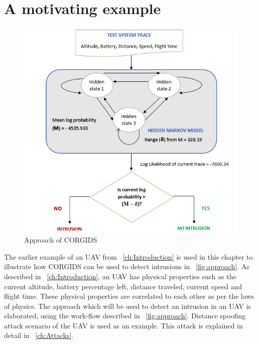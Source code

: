 \section{A motivating example}

\begin{figure}[ht]
    \centering
    \includegraphics[scale=0.75,keepaspectratio = true]{Graphics/CORGIDSApproach.png}
    \caption{Approach of CORGIDS}
    \label{fig:approach}
\end{figure}

The earlier example of an \ac{UAV} from ~\autoref{ch:Introduction} is used in this chapter to illustrate how \ac{CORGIDS} can be used to detect intrusions in ~\autoref{fig:approach}. As described in ~\autoref{ch:Introduction}, an \ac{UAV} has physical properties such as the current altitude, battery percentage left, distance traveled, current speed and flight time. These physical properties are correlated to each other as per the laws of physics. The approach which will be used to detect an intrusion in an \ac{UAV} is elaborated, using the work-flow described in ~\autoref{fig:approach}. Distance spoofing attack scenario of the \ac{UAV} is used as an example. This attack is explained in detail in ~\autoref{ch:Attacks}.

